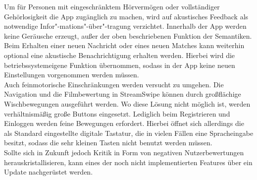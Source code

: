 \noindent 
Um für Personen mit eingeschränktem Hörvermögen oder vollständiger Gehörlosigkeit die App zugänglich zu machen, wird auf akustisches Feedback als notwendige Infor"-mations"-über"-tragung verzichtet. Innerhalb der App werden keine Geräusche erzeugt, außer der oben beschriebenen Funktion der Semantiken. Beim Erhalten einer neuen Nachricht oder eines neuen Matches kann weiterhin optional eine akustische Benachrichtigung erhalten werden. Hierbei wird die betriebssystemeigene Funktion übernommen, sodass in der App keine neuen Einstellungen vorgenommen werden müssen.\\

\noindent
Auch feinmotorische Einschränkungen werden versucht zu umgehen. Die Navigation und die Filmbewertung in StreamSwipe können durch großflächige Wischbewegungen ausgeführt werden. Wo diese Lösung nicht möglich ist, werden verhältnismäßig große Buttons eingesetzt. Lediglich beim Registrieren und Einloggen werden feine Bewegungen erfordert. Hierbei öffnet sich allerdings die als Standard eingestellte digitale Tastatur, die in vielen Fällen eine Spracheingabe besitzt, sodass die sehr kleinen Tasten nicht benutzt werden müssen.\\

\noindent
Sollte sich in Zukunft jedoch Kritik in Form von negativen Nutzerbewertungen herauskristallisieren, kann eines der noch nicht implementierten Features über ein Update nachgerüstet werden.